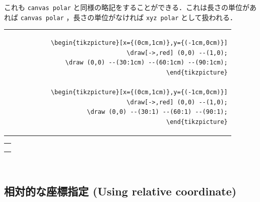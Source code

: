 \documentclass[lualatex]{jlreq}
\begin{document}
これも \verb|canvas polar| と同様の略記をすることができる．これは長さの単位があれば \verb|canvas polar| ，長さの単位がなければ \verb|xyz polar| として扱われる．
\\[0.5em]
\begin{minipage}{0.64 \textwidth}
    \begin{flushright}
        \begin{tabular}{r}
            \begin{lstlisting}[language={[LaTeX] TeX},
            numbers=none,breaklines=true,gobble=12,frame=none]
            \begin{tikzpicture}[x={(0cm,1cm)},y={(-1cm,0cm)}]
                \draw[->,red] (0,0) --(1,0);
                \draw (0,0) --(30:1cm) --(60:1cm) --(90:1cm);
            \end{tikzpicture}

            \begin{tikzpicture}[x={(0cm,1cm)},y={(-1cm,0cm)}]
                \draw[->,red] (0,0) --(1,0);
                \draw (0,0) --(30:1) --(60:1) --(90:1);
            \end{tikzpicture}
            \end{lstlisting}
        \end{tabular}
    \end{flushright}
\end{minipage}
\begin{minipage}{0.28 \textwidth}
    \begin{flushleft}
        \begin{tabular}{l}
            \begin{tikzpicture}[x={(0cm,1cm)},y={(-1cm,0cm)}]
                \draw[->,red] (0,0) --(1,0);
                \draw (0,0) --(30:1cm) --(60:1cm) --(90:1cm);
            \end{tikzpicture}
            \\
            \\
            \begin{tikzpicture}[x={(0cm,1cm)},y={(-1cm,0cm)}]
                \draw[->,red] (0,0) --(1,0);
                \draw (0,0) --(30:1) --(60:1) --(90:1);
            \end{tikzpicture}
        \end{tabular}
    \end{flushleft}
\end{minipage}
\hfill
\\[1em]

\subsection{相対的な座標指定 (Using relative coordinate)}
\end{document}
